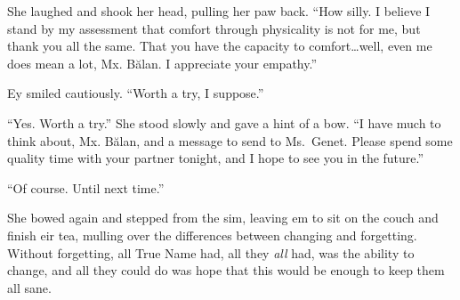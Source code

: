 She laughed and shook her head, pulling her paw back. ``How silly. I believe I stand by my assessment that comfort through physicality is not for me, but thank you all the same. That you have the capacity to comfort\ldots{}well, even me does mean a lot, Mx. Bălan. I appreciate your empathy.''

Ey smiled cautiously. ``Worth a try, I suppose.''

``Yes. Worth a try.'' She stood slowly and gave a hint of a bow. ``I have much to think about, Mx. Bălan, and a message to send to Ms.~Genet. Please spend some quality time with your partner tonight, and I hope to see you in the future.''

``Of course. Until next time.''

She bowed again and stepped from the sim, leaving em to sit on the couch and finish eir tea, mulling over the differences between changing and forgetting. Without forgetting, all True Name had, all they \emph{all} had, was the ability to change, and all they could do was hope that this would be enough to keep them all sane.
